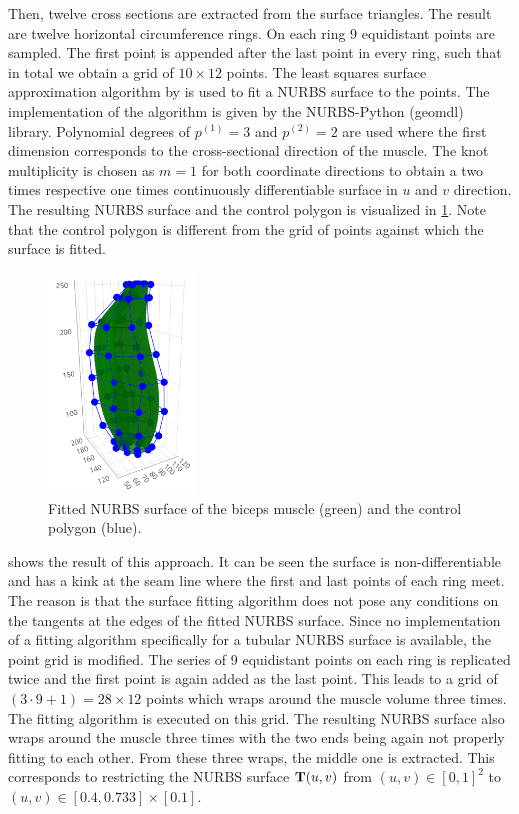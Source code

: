 Then, twelve cross sections are extracted from the surface triangles. The result are twelve horizontal circumference rings. On each ring 9 equidistant points are sampled. The first point is appended after the last point in every ring, such that in total we obtain a grid of $10 \times 12$ points. The least squares surface approximation algorithm by \cite{piegl2012nurbs} is used to fit a NURBS surface to the points. The implementation of the algorithm is given by the NURBS-Python (geomdl) library. Polynomial degrees of $p^{(1)} = 3$ and $p^{(2)}=2$ are used where the first dimension corresponds to the cross-sectional direction of the muscle. The knot multiplicity is chosen as $m=1$ for both coordinate directions to obtain a two times respective one times continuously differentiable surface in $u$ and $v$ direction. The resulting NURBS surface and the control polygon is visualized in \cref{fig:biceps_splines_control_points}. Note that the control polygon is different from the grid of points against which the surface is fitted.
%
\begin{figure}%
  \centering%
  \includegraphics[width=0.35\textwidth]{images/fiber_creation/splines01.png}%
  \caption{Fitted NURBS surface of the biceps muscle (green) and the control polygon (blue).}%
  \label{fig:biceps_splines_control_points}%
\end{figure}%
%
 shows the result of this approach. It can be seen the surface is non-differentiable and has a kink at the seam line where the first and last points of each ring meet. The reason is that the surface fitting algorithm does not pose any conditions on the tangents at the edges of the fitted NURBS surface. Since no implementation of a fitting algorithm specifically for a tubular NURBS surface is available, the point grid is modified. The series of 9 equidistant points on each ring is replicated twice and the first point is again added as the last point. This leads to a grid of $(3\cdot 9+1) = 28 \times 12$ points which wraps around the muscle volume three times. The fitting algorithm is executed on this grid. The resulting NURBS surface also wraps around the muscle three times with the two ends being again not properly fitting to each other. From these three wraps, the middle one is extracted. This corresponds to restricting the NURBS surface $\textbf{T}(u,v)$ from $(u,v) \in [0,1]^2$ to $(u,v) \in [0.4,0.733]\times [0.1]$.

